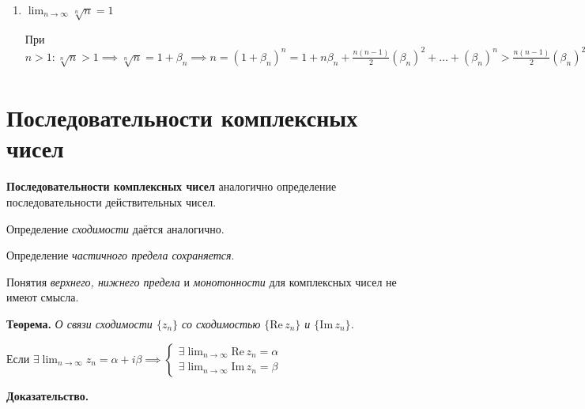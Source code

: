 \documentclass{article}
\newcommand{\parspace}{\vspace{10pt}}
\newcommand{\imagin}{\mathrm{Im} \,}
\newcommand{\real}{\mathrm{Re} \,}
\newcommand{\dslim}{\displaystyle\lim}
\newcommand{\dslimn}{\dslim_{n \to \infty}}
\theoremstyle{break}
\begin{document}
\begin{enumerate}
    $\implies$ по \textit{$7^{\text{о}}$ свойству сходящихся последовательностей}
    $\dslimn \frac{a^n}{n!} = 0$

    
    \item $\dslimn \sqrt[n]{n} = 1$
    
    При $n > 1: \sqrt[n]{n} > 1 \implies \sqrt[n]{n} = 1 + \beta_n \implies
    n = (1 + \beta_n)^n = 1 + n \beta_n + \frac{n (n - 1)}{2} (\beta_n)^2 + \dots +
    (\beta_n)^n > \frac{n (n - 1)}{2} (\beta_n) ^ 2 \implies
    0 < \beta_n < \sqrt{\frac{2}{n-1}} \implies
    \dslimn \beta_n = 0 \implies
    \dslimn \sqrt[n]{n} = 1$
\end{enumerate}

\section{Последовательности комплексных чисел}

\textbf{Последовательности комплексных чисел} аналогично определение последовательности
действительных чисел.

Определение \textit{сходимости} даётся аналогично.

Определение \textit{частичного предела сохраняется}.

Понятия \textit{верхнего, нижнего предела} и \textit{монотонности} для комплексных
чисел не имеют смысла.

\parspace

\textbf{Теорема.} \textit{О связи сходимости $\{z_n\}$ со сходимостью $\{\real z_n\}$ и $\{\imagin z_n\}$.}

Если $\exists \dslimn z_n = \alpha + i \beta
\implies \begin{cases}
    \exists \dslimn \real z_n = \alpha \\
    \exists \dslimn \imagin z_n = \beta
\end{cases}$

\textbf{Доказательство.}
\end{document}
